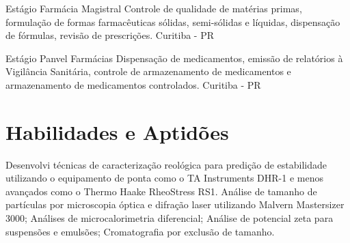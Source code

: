 {Estágio}
{Farmácia Magistral}
{
	Controle de qualidade de matérias primas, 
	formulação de formas farmacêuticas sólidas, 
	semi-sólidas e líquidas, dispensação de fórmulas, 
	revisão de prescrições.
}
{Curitiba - PR}

{Estágio}
{Panvel Farmácias}
{
	Dispensação de medicamentos, 
	emissão de relatórios à Vigilância Sanitária, 
	controle de armazenamento de medicamentos e 
	armazenamento de medicamentos controlados.
}
{Curitiba - PR}

\section{Habilidades e Aptidões}




{Desenvolvi técnicas de caracterização reológica para 
predição de estabilidade utilizando o 
equipamento de ponta como o TA Instruments DHR-1 e 
menos avançados como o Thermo Haake RheoStress RS1.}\hfill
{}
{Análise de tamanho de partículas por microscopia óptica e difração laser utilizando Malvern Mastersizer 3000;
Análises de microcalorimetria diferencial;
Análise de potencial zeta para suspensões e emulsões;
Cromatografia por exclusão de tamanho.}


\hfill
{}


\hfill
{}



